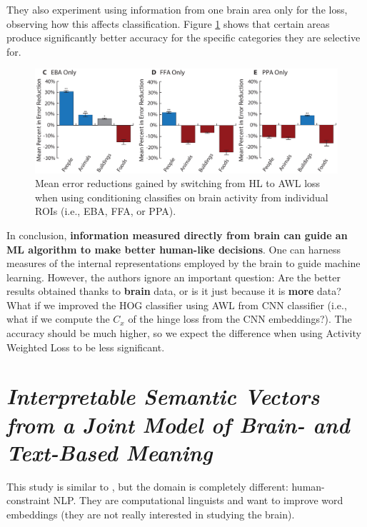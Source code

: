 They also experiment using information from one brain area only for the loss, observing how this affects classification. Figure \ref{fig:fong_2} shows that certain areas produce significantly better accuracy for the specific categories they are selective for.\\

\begin{figure}[!ht]
    \centering
    \captionsetup{width=.8\linewidth}
    \includegraphics[width=0.7\linewidth]{images/fong_2.png}
    \caption{Mean error reductions gained by switching from HL to AWL loss when using conditioning classifies on brain activity from individual ROIs (i.e., EBA, FFA, or PPA).}
    \label{fig:fong_2}
\end{figure}

In conclusion, \textbf{information measured directly from brain can guide an ML algorithm to make better human-like decisions}.
One can harness measures of the internal representations employed by the brain to guide machine learning.
However, the authors ignore an important question: Are the better results obtained thanks to \textbf{brain} data, or is it just because it is \textbf{more} data? What if we improved the HOG classifier using AWL from CNN classifier (i.e., what if we compute the $C_x$ of the hinge loss from the CNN embeddings?).
The accuracy should be much higher, so we expect the difference when using Activity Weighted Loss to be less significant.

\section[Interpretable semantic vectors from a joint model of brain- and text-based meaning]{\textit{Interpretable Semantic Vectors from a Joint Model of Brain- and Text-Based Meaning}\\ }

This study is similar to \cite{fong2017using}, but the domain is completely different: human-constraint NLP. They are computational linguists and want to improve word embeddings (they are not really interested in studying the brain).

